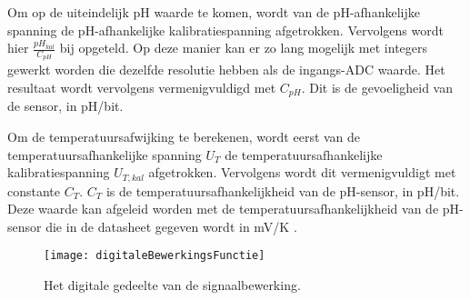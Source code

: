 Om op de uiteindelijk pH waarde te komen, wordt van de pH-afhankelijke spanning de pH-afhankelijke kalibratiespanning afgetrokken. Vervolgens wordt hier $\frac{pH_{kal}}{C_{pH}}$ bij opgeteld. Op deze manier kan er zo lang mogelijk met integers gewerkt worden die dezelfde resolutie hebben als de ingangs-ADC waarde. Het resultaat wordt vervolgens vermenigvuldigd met $C_{pH}$. Dit is de gevoeligheid van de sensor, in pH/bit.

Om de temperatuursafwijking te berekenen, wordt eerst van de temperatuursafhankelijke spanning $U_T$ de temperatuursafhankelijke kalibratiespanning $U_{T,kal}$ afgetrokken. Vervolgens wordt dit vermenigvuldigt met constante $C_T$. $C_T$ is de temperatuursafhankelijkheid van de pH-sensor, in pH/bit. Deze waarde kan afgeleid worden met de temperatuursafhankelijkheid van de pH-sensor die in de datasheet gegeven wordt in mV/K \cite{isfet}.

\begin{figure}[!htbp]
    \centering
    \texttt{[image: digitaleBewerkingsFunctie]}
    \caption{Het digitale gedeelte van de signaalbewerking.}
    \label{fig:digitaleBewerkingsFunctie}
\end{figure}

















%
